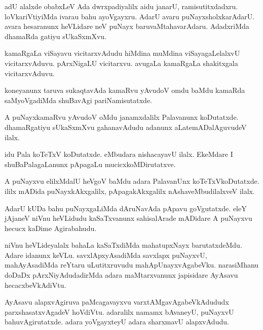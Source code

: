 \documentclass{article}
\begin{document}
\begin{mn}%
adU alalxde obabxLeV Ada dwrxpadiyalilx aidu janarU, ramisutitxdadxru. loVkariVtiyiMda 
ivarau bahu ayoVgayxru. AdarU avaru puNayxsholxkarAdarU. avara hesaranunx heVLidare neV 
puNayx baruvaMtahavarAdaru. AdadxriMda dhamaRda gatiyu sUkaSxmXvu.
\end{mn}

\begin{mn}%
kamaRgaLa viSayavu vicitarxvAdudu hiMdina muMdina viSayagaLelalxvU vicitarxvAduvu. 
pArxNigaLU vicitarxvu. avugaLa kamaRgaLa shakitxgala vicitarxvAduvu.
\end{mn}

\begin{mn}%
koneyanunx taruva sukaqtavAda kamaRvu yAvudoV omdu baMdu kamaRda saMyoVgadiMda shuBavAgi 
pariNamisutatxde.
\end{mn}

\begin{mn}%
A puNayxkamaRvu yAvudoV oMdu janamxdalilx Palavanunx koDutatxde. dhamaRgatiyu sUkaSxmXvu 
gahanavAdudu adanunx aLatemADalAguvudeV ilalx.
\end{mn}

\begin{mn}%
idu Pala koTeTxV koDutatxde. eMbudara nishacayavU ilalx. EkeMdare I shuBaPalagaLanunx 
pApagaLu mucicxkoMDirutatxve.
\end{mn}

\begin{mn}%
A puNayxvu elilxMdalU heVgoV baMdu adara PalavanUnx koTeTxVkoDutatxde. ililx mADida 
puNayxkAkxgalilx, pApagakAkxgalilx nAshaveMbudilalxveV ilalx.
\end{mn}

\begin{mn}%
AdarU kUDa bahu puNayxgaLiMda dAruNavAda pApavu goVgutatxde. eleY jAjaneV niVnu heVLidudu 
kaSaTxvanunx sahisalArade mADidare A puNayxvu hecucx kaDime Agirabahudu.
\end{mn}

\begin{mn}%
niVnu heVLideyalalx bahaLa kaSaTxdiMda mahatupxNayx barutatxdeMdu. Adare idanunx keVLu. 
savxlApxyAsadiMda savxlapx puNayxvU, mahAyAsadiMda reYtaru uLutitxruvudu 
mahApUnayxvAgabeVku. narasiMhanu doDaDx pArxNiyAdudadirMda adara maMtarxvanunx japisidare 
AyAsavu hecacxbeVkAdiVtu.
\end{mn}

\begin{mn}%
AyAsavu alapxvAgiruva paMcagavayxvu varxtAMgavAgabeVkAdududx parxshasatxvAgadeV hoVdiVtu. 
adaralilx namamx bAvaneyU, puNayxvU bahuvAgirutatxde. adara yoVgayxteyU adara sharxmavU 
alapxvAdudu.
\end{mn}
\end{document}
